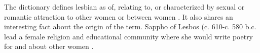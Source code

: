 The dictionary defines lesbian as of, relating to, or characterized by sexual 
or romantic attraction to other women or between women \cite{lesbian-def}. It 
also shares an interesting fact about the origin of the term. Sappho of Lesbos 
(c. 610-c. 580 b.c. lead a female religion and educational community where she 
would write poetry for and about other women \cite{lesbian-def}.

